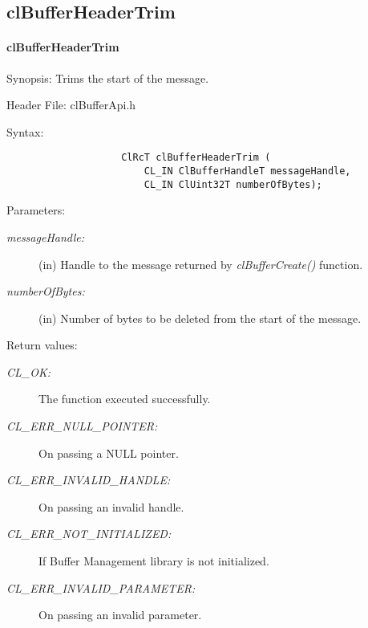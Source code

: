 \subsection{clBufferHeaderTrim}
\hypertarget{pagebuf124}{}\paragraph{cl\-Buffer\-Header\-Trim}\label{pagebuf124}
\begin{Desc}
\item[Synopsis:]Trims the start of the message.\end{Desc}
\begin{Desc}
\item[Header File:]clBufferApi.h\end{Desc}
\begin{Desc}
\item[Syntax:]

\footnotesize\begin{verbatim}    
					ClRcT clBufferHeaderTrim (
						CL_IN ClBufferHandleT messageHandle, 
						CL_IN ClUint32T numberOfBytes);

\end{verbatim}
\normalsize
\end{Desc}
\begin{Desc}
\item[Parameters:]
\begin{description}
\item[{\em message\-Handle:}](in) Handle to the message returned by \textit{clBufferCreate()} function. \item[{\em number\-Of\-Bytes:}](in) Number of bytes to be deleted from the start of the message.\end{description}
\end{Desc}
\begin{Desc}
\item[Return values:]
\begin{description}
\item[{\em CL\_\-OK:}]The function executed successfully. \item[{\em CL\_\-ERR\_\-NULL\_\-POINTER:}]On passing a NULL pointer. \item[{\em CL\_\-ERR\_\-INVALID\_\-HANDLE:}]On passing an invalid handle. \item[{\em CL\_\-ERR\_\-NOT\_\-INITIALIZED:}]If Buffer Management library is not initialized. \item[{\em CL\_\-ERR\_\-INVALID\_\-PARAMETER:}]On passing an invalid parameter.\end{description}
\end{Desc}

